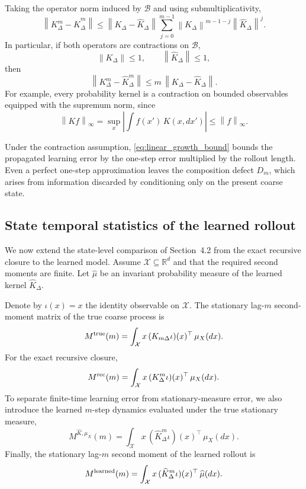 \documentclass[final,hidelinks]{siamart251216}
\newcommand{\cX}{\mathcal{X}}
\newcommand{\norm}[1]{\left\lVert #1\right\rVert}
\begin{document}
Taking the operator norm induced by $\mathcal B$ and using submultiplicativity,
\[
    \norm{K_\Delta^m-\widehat K_\Delta^m}
    \le
    \norm{K_\Delta-\widehat K_\Delta}
    \sum_{j=0}^{m-1}
    \norm{K_\Delta}^{m-1-j}
    \norm{\widehat K_\Delta}^{j}.
\]
In particular, if both operators are contractions on $\mathcal B$,
\[
    \norm{K_\Delta}\le1,
    \qquad
    \norm{\widehat K_\Delta}\le1,
\]
then
\begin{equation}
    \norm{K_\Delta^m-\widehat K_\Delta^m}
    \le
    m\,\norm{K_\Delta-\widehat K_\Delta}.
    \label{eq:linear_growth_bound}
\end{equation}
For example, every probability kernel is a contraction on bounded
observables equipped with the supremum norm, since
\[
    \norm{Kf}_\infty
    =
    \sup_x
    \left|
        \int f(x')\,K(x,dx')
    \right|
    \le
    \norm{f}_\infty.
\]

Under the contraction assumption, \eqref{eq:linear_growth_bound} bounds
the propagated learning error by the one-step error multiplied by the
rollout length. Even a perfect one-step approximation leaves the
composition defect $D_m$, which arises from information discarded by
conditioning only on the present coarse state.

\subsection{State temporal statistics of the learned rollout}

We now extend the state-level comparison of Section~4.2 from the exact
recursive closure to the learned model. Assume $\cX\subseteq\mathbb R^d$
and that the required second moments are finite. Let $\widehat\mu$ be an
invariant probability measure of the learned kernel $\widehat K_\Delta$.

Denote by $\iota(x)=x$ the identity observable on $\cX$. The stationary
lag-$m$ second-moment matrix of the true coarse process is
\[
    M^{\rm true}(m)
    =
    \int_{\cX}
    x\,
    (K_{m\Delta}\iota)(x)^\top
    \,\mu_X(dx).
\]
For the exact recursive closure,
\[
    M^{\rm rec}(m)
    =
    \int_{\cX}
    x\,
    (K_\Delta^m\iota)(x)^\top
    \,\mu_X(dx).
\]
To separate finite-time learning error from stationary-measure error, we
also introduce the learned $m$-step dynamics evaluated under the true
stationary measure,
\[
    M^{\widehat K,\mu_X}(m)
    =
    \int_{\cX}
    x\,
    (\widehat K_\Delta^m\iota)(x)^\top
    \,\mu_X(dx).
\]
Finally, the stationary lag-$m$ second moment of the learned rollout is
\[
    M^{\rm learned}(m)
    =
    \int_{\cX}
    x\,
    (\widehat K_\Delta^m\iota)(x)^\top
    \,\widehat\mu(dx).
\]
\end{document}
